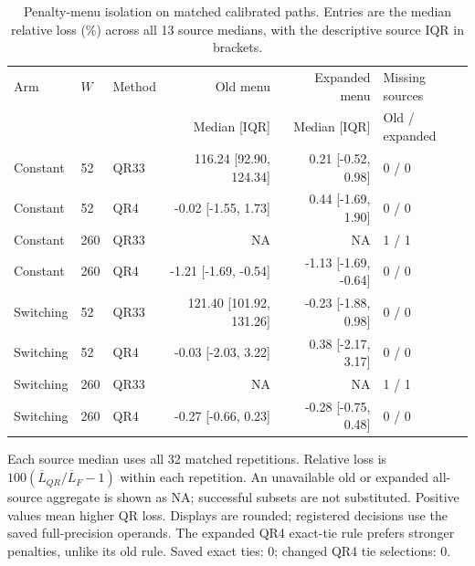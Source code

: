 \begin{table}[t]
\centering
\small
\caption{Penalty-menu isolation on matched calibrated paths. Entries are the median relative loss (\%) across all 13 source medians, with the descriptive source IQR in brackets.}
\label{tab:v10-menu-isolation}
\begin{tabular}{lllrrl}
\toprule
Arm & $W$ & Method & Old menu & Expanded menu & Missing sources \\
 & & & Median [IQR] & Median [IQR] & Old / expanded \\
\midrule
Constant & 52 & QR33 & 116.24 [92.90, 124.34] & 0.21 [-0.52, 0.98] & 0 / 0 \\
Constant & 52 & QR4 & -0.02 [-1.55, 1.73] & 0.44 [-1.69, 1.90] & 0 / 0 \\
Constant & 260 & QR33 & \textsc{NA} & \textsc{NA} & 1 / 1 \\
Constant & 260 & QR4 & -1.21 [-1.69, -0.54] & -1.13 [-1.69, -0.64] & 0 / 0 \\
Switching & 52 & QR33 & 121.40 [101.92, 131.26] & -0.23 [-1.88, 0.98] & 0 / 0 \\
Switching & 52 & QR4 & -0.03 [-2.03, 3.22] & 0.38 [-2.17, 3.17] & 0 / 0 \\
Switching & 260 & QR33 & \textsc{NA} & \textsc{NA} & 1 / 1 \\
Switching & 260 & QR4 & -0.27 [-0.66, 0.23] & -0.28 [-0.75, 0.48] & 0 / 0 \\
\bottomrule
\end{tabular}
\par\vspace{2pt}
\begin{minipage}{0.97\linewidth}\footnotesize
Each source median uses all 32 matched repetitions. Relative loss is $100(\overline L_{QR}/\overline L_F-1)$ within each repetition. An unavailable old or expanded all-source aggregate is shown as NA; successful subsets are not substituted. Positive values mean higher QR loss. Displays are rounded; registered decisions use the saved full-precision operands. The expanded QR4 exact-tie rule prefers stronger penalties, unlike its old rule. Saved exact ties: 0; changed QR4 tie selections: 0.
\end{minipage}
\end{table}
